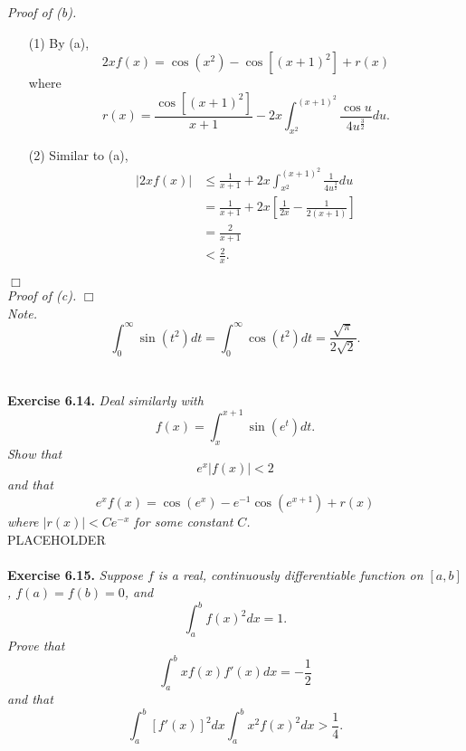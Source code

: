 \documentclass{article}
\begin{document}
\emph{Proof of (b).}
\begin{enumerate}
  \item[(1)]
  By (a),
  \[
    2xf(x) = \cos(x^2) - \cos[(x+1)^2] + r(x)
  \]
  where
  \[
    r(x)
    = \frac{\cos[(x+1)^2]}{x+1}
    - 2x\int_{x^2}^{(x+1)^2} \frac{\cos u}{4u^{\frac{3}{2}}} du.
  \]

  \item[(2)]
  Similar to (a),
  \begin{align*}
    |2xf(x)|
    &\leq \frac{1}{x+1}
      + 2x \int_{x^2}^{(x+1)^2} \frac{1}{4u^{\frac{3}{2}}} du \\
    &= \frac{1}{x+1}
      + 2x \left[ \frac{1}{2x} - \frac{1}{2(x+1)} \right] \\
    &= \frac{2}{x+1} \\
    &< \frac{2}{x}.
  \end{align*}
\end{enumerate}
$\Box$ \\



\emph{Proof of (c).}
$\Box$ \\



\emph{Note.}
\[
  \int_{0}^{\infty} \sin(t^2)dt
  = \int_{0}^{\infty} \cos(t^2)dt
  = \frac{\sqrt{\pi}}{2\sqrt{2}}.
\] \\\\






\textbf{Exercise 6.14.}
\emph{Deal similarly with
\[
  f(x) = \int_{x}^{x+1} \sin(e^t) dt.
\]
Show that
\[
  e^x|f(x)| < 2
\]
and that
\[
  e^x f(x) = \cos(e^x) - e^{-1} \cos(e^{x+1}) + r(x)
\]
where $|r(x)| < Ce^{-x}$ for some constant $C$.} \\

PLACEHOLDER \\\\






\textbf{Exercise 6.15.}
\emph{Suppose $f$ is a real, continuously differentiable function on $[a,b]$,
$f(a)=f(b)=0$, and
\[
  \int_{a}^{b} f(x)^2 dx = 1.
\]
Prove that
\[
  \int_{a}^{b} xf(x)f'(x) dx = -\frac{1}{2}
\]
and that
\[
  \int_{a}^{b} [f'(x)]^2 dx \int_{a}^{b} x^2f(x)^2 dx > \frac{1}{4}.
\]
} \\
\end{document}
